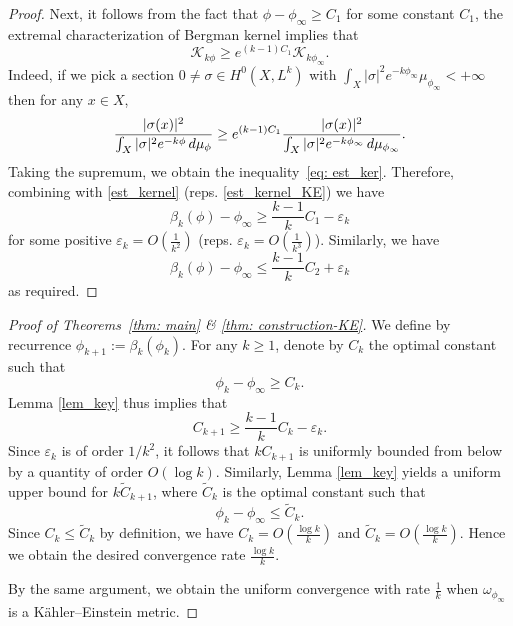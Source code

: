 \documentclass[a4paper, 11pt]{amsart}
\theoremstyle{plain}
\numberwithin{equation}{section} %
\numberwithin{figure}{section} %
\theoremstyle{plain}
\theoremstyle{plain}
\theoremstyle{plain}
\theoremstyle{plain}
\theoremstyle{remark}
\theoremstyle{definition}
\theoremstyle{definition}
\newcommand{\K}{\mathcal{K}}
\begin{document}
\begin{proof}
\medskip
Next, it follows from the fact that $\phi-\phi_{\infty}\geq C_1$ for some constant $C_1$, the extremal characterization of Bergman kernel implies that 
\begin{equation}\label{eq: est_ker}
\K_{k\phi }\geq e^{(k-1)C_1}\K_{k\phi_{\infty}}.
\end{equation}
Indeed, if we pick a section $0\neq  \sigma\in H^0{(X,L^k)}$ with $\int_X|\sigma|^2e^{-k\phi_\infty}\mu_{\phi_\infty}<+\infty$ then  for any $x\in X$,
\begin{equation*}
    \frac{|\sigma(x)|^2}{\int_X |\sigma|^2e^{-k\phi}\,{\rm d}\mu_{\phi}}\geq   e^{(k-1)C_1}\frac{|\sigma(x)|^2}{\int_X |\sigma|^2e^{-k\phi_\infty}\,{\rm d}\mu_{\phi_\infty}}.
\end{equation*}
Taking the supremum, we obtain the inequality~\eqref{eq: est_ker}. 
Therefore, combining with \eqref{est_kernel}  (reps. \eqref{est_kernel_KE}) we have
$$ \beta_k(\phi)-\phi_{\infty}\geq \frac{k-1}{k}C_1 - \varepsilon_k  $$
for some positive $\varepsilon_k=O(\frac{1}{k^2})$ (reps. $\varepsilon_k=O(\frac{1}{k^3})$).
Similarly, we have
$$ \beta_k(\phi)- \phi_{\infty}\leq \frac{k-1}{k}C_2 + \varepsilon_k  $$
as required.
\end{proof}

\begin{proof}[Proof of Theorems~\ref{thm: main} \& \ref{thm: construction-KE}]
We define by recurrence  $\phi_{k+1}:=\beta_k(\phi_k)$. 
For any $k\geq 1$, denote by $C_k$ the optimal constant such that
\begin{equation}
\phi_k-\phi_{\infty}\geq C_k.
\end{equation}
Lemma \ref{lem_key} thus implies that 
$$C_{k+1}\geq \frac{k-1}{k}  C_k-\varepsilon_k .$$
Since $\varepsilon_k$ is of order $1/k^2$, it follows that $k C_{k+1}$ is uniformly bounded from below by a quantity of order $O(\log k)$.
  Similarly, Lemma \ref{lem_key} yields a uniform upper bound for $k \widetilde C_{k+1}$, where $\widetilde C_k$ is the optimal constant such that 
$$\phi_k-\phi_{\infty}\leq  \widetilde C_k.$$
Since $C_k\leq \widetilde C_k$ by definition, we have $C_k=O\left(\frac{\log k}{k}\right)$ and $\widetilde C_k=O\left(\frac{\log k}{k}\right)$. 
Hence we obtain the desired convergence rate $\frac{\log k}{k}$.

By the same argument, we obtain the uniform convergence with rate $\frac{1}{k}$ when $\omega_{\phi_\infty}$ is a K\"ahler--Einstein metric.
\end{proof}
\end{document}
